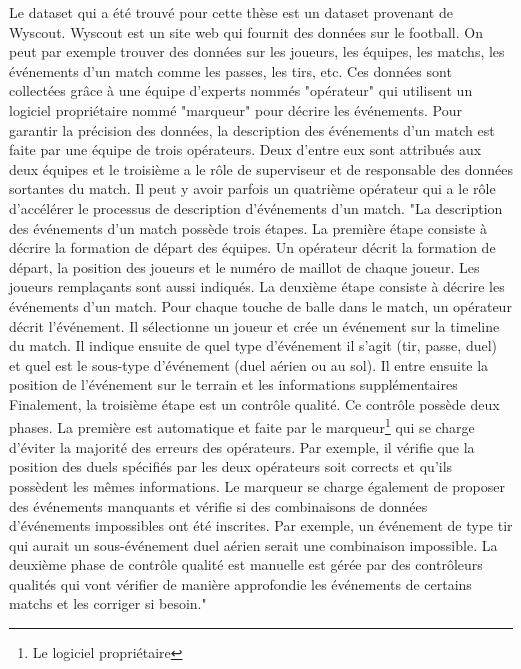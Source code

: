 \documentclass[12pt]{article}
\begin{document}
\noindent Le dataset qui a été trouvé pour cette thèse est un dataset provenant de Wyscout. 
Wyscout est un site web qui fournit des données sur le football. 
On peut par exemple trouver des données sur les joueurs, les équipes, les matchs, les événements d'un match comme les passes, les tirs, etc.
Ces données sont collectées grâce à une équipe d'experts nommés "opérateur" qui utilisent un logiciel propriétaire nommé "marqueur" pour décrire les événements.
Pour garantir la précision des données, la description des événements d'un match est faite par une équipe de trois opérateurs. 
Deux d'entre eux sont attribués aux deux équipes et le troisième a le rôle de superviseur et de responsable des données sortantes du match. \cite{pappalardoPublicDataSet2019} 
Il peut y avoir parfois un quatrième opérateur qui a le rôle d'accélérer le processus de description d'événements d'un match. 
\newline\newline
"La description des événements d'un match possède trois étapes.
La première étape consiste à décrire la formation de départ des équipes. 
Un opérateur décrit la formation de départ, la position des joueurs et le numéro de maillot de chaque joueur. Les joueurs remplaçants sont aussi indiqués. 
La deuxième étape consiste à décrire les événements d'un match.
Pour chaque touche de balle dans le match, un opérateur décrit l'événement. 
Il sélectionne un joueur et crée un événement sur la timeline du match.
Il indique ensuite de quel type d'événement il s'agit (tir, passe, duel) et quel est le sous-type d'événement (duel aérien ou au sol).
Il entre ensuite la position de l'événement sur le terrain et les informations supplémentaires
Finalement, la troisième étape est un contrôle qualité.
Ce contrôle possède deux phases. 
La première est automatique et faite par le marqueur\footnote{Le logiciel propriétaire} qui se charge d'éviter la majorité des erreurs des opérateurs.
Par exemple, il vérifie que la position des duels spécifiés par les deux opérateurs soit corrects et qu'ils possèdent les mêmes informations.
Le marqueur se charge également de proposer des événements manquants et vérifie si des combinaisons de données d'événements impossibles ont été inscrites.
Par exemple, un événement de type tir qui aurait un sous-événement duel aérien serait une combinaison impossible.
La deuxième phase de contrôle qualité est manuelle est gérée par des contrôleurs qualités qui vont vérifier de manière approfondie les événements de certains matchs et les corriger si besoin." \cite{pappalardoPublicDataSet2019}
\end{document}
